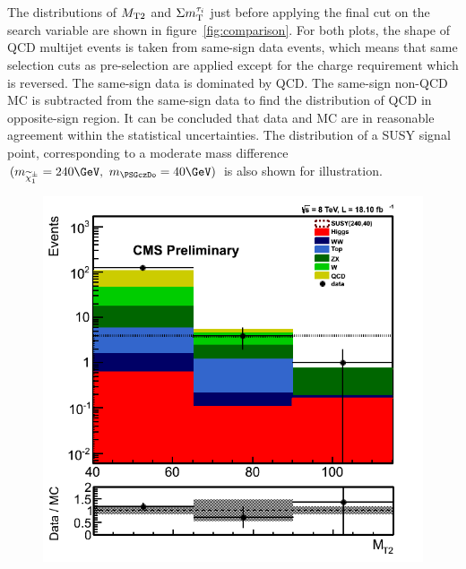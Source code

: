 The distributions of ${M_{\rm T2}}$ and $\Sigma m_{\rm T}^{\tau_i}$ just before applying the final cut on the search variable 
are shown in figure~\ref{fig:comparison}. 
For both plots, the shape of QCD multijet events
is taken from same-sign data events, which means that same selection cuts as pre-selection are applied except for the charge
requirement which is reversed. The same-sign data is dominated by QCD. The same-sign non-QCD MC is subtracted from the same-sign data to
find the distribution of QCD in opposite-sign region.   
 It can be concluded that data and MC are in reasonable agreement within the statistical uncertainties. The distribution of a SUSY signal point, 
corresponding to a moderate mass difference $(m_{\chione}=240\GeV,~m_{\PSGczDo}=40\GeV)$ is also shown for illustration.
\begin{figure}[!Hhtb]
\centering
\includegraphics[angle=0,scale=0.35]{TauTauFigs/mt2.png}

\end{figure}
